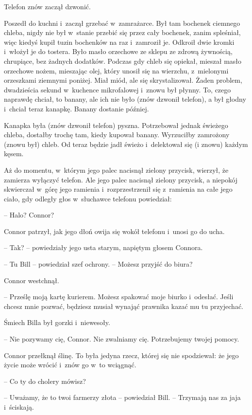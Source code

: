 \documentclass[oneside,polish,11pt,rmheadings]{mwbk}
\begin{document}
Telefon znów zaczął dzwonić.

Poszedł do kuchni i~zaczął grzebać w~zamrażarce. Był tam bochenek ciemnego chleba, nigdy nie był w~stanie przebić się przez cały bochenek, zanim spleśniał, więc kiedyś kupił tuzin bochenków na raz i~zamroził je. Odkroił dwie kromki i~włożył je do tostera. Było masło orzechowe ze sklepu ze zdrową żywnością, chrupiące, bez żadnych dodatków. Podczas gdy chleb się opiekał, mieszał masło orzechowe nożem, mieszając olej, który unosił się na wierzchu, z~mielonymi orzeszkami ziemnymi poniżej. Miał miód, ale się skrystalizował. Żaden problem, dwadzieścia sekund w~kuchence mikrofalowej i~znowu był płynny. To, czego naprawdę chciał, to banany, ale ich nie było (znów dzwonił telefon), a był głodny i~chciał teraz kanapkę. Banany dostanie później.

Kanapka była (znów dzwonił telefon) pyszna. Potrzebował jednak świeżego chleba, dostałby trochę tam, kiedy kupował banany. Wyrzuciłby zamrożony (znowu był) chleb. Od teraz będzie jadł świeżo i~delektował się (i znowu) każdym kęsem.

Aż do momentu, w~którym jego palec nacisnął zielony przycisk, wierzył, że zamierza wyłączyć telefon. Ale jego palec nacisnął zielony przycisk, a niepokój skwierczał w~górę jego ramienia i~rozprzestrzenił się z~ramienia na całe jego ciało, gdy odległy głos w~słuchawce telefonu powiedział: 

-- Halo? Connor?

Connor patrzył, jak jego dłoń owija się wokół telefonu i~unosi go do ucha.

-- Tak? -- powiedziały jego usta starym, napiętym głosem Connora.

-- Tu Bill -- powiedział szef ochrony. -- Możesz przyjść do biura? 

Connor westchnął. 

-- Prześlę moją kartę kurierem. Możesz spakować moje biurko i~odesłać. Jeśli chcesz mnie pozwać, będziesz musiał wynająć prawnika kazać mu tu przyjechać.

Śmiech Billa był gorzki i~niewesoły. 

-- Nie pozywamy cię, Connor. Nie zwalniamy cię. Potrzebujemy twojej pomocy.

Connor przełknął ślinę. To była jedyna rzecz, której się nie spodziewał: że jego życie może wrócić i~znów go w~to wciągnąć.

 -- Co ty do cholery mówisz? 

-- Uważamy, że to twoi farmerzy złota -- powiedział Bill. -- Trzymają nas za jaja i~ściskają.
\end{document}
